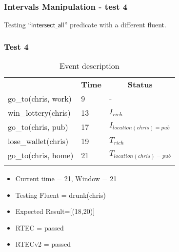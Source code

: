 \documentclass[8pt]{beamer}
\def \patsize {}
\def\intersectall{\textsf{\patsize intersect\_all}}
\begin{document}
\begin{frame}
    \frametitle{Intervals Manipulation - test 4}
    \small Testing ``$\intersectall$'' predicate with a different fluent.\linebreak
    \subsubsection{Test 4}
    \begin{minipage}{0.48\linewidth}
        \begin{table}[t!]
            \caption{Event description}
            \begin{center}

                \begin{tabular}{lll}
                    \hline\noalign{\smallskip}
                    \multicolumn{1}{l}{\textbf{Event}} & \multicolumn{1}{c}{\textbf{Time}} & \multicolumn{1}{c}{\textbf{Status}}   \\
                    go\_to(chris, work)& 9 & -\\
                    win\_lottery(chris)& 13 & $I_{rich}$\\
                    go\_to(chris, pub)& 17 & $I_{location(chris)=pub}$\\
                    lose\_wallet(chris)& 19 & $T_{rich}$ \\
                    go\_to(chris, home)& 21 & $T_{location(chris)=pub}$\\
                    \noalign{\smallskip}
                    \hline
                \end{tabular}
            \end{center}
        \end{table}

        \begin{itemize}
            \item Current time = 21, Window = 21
            \item Testing Fluent = drunk(chris)
            \item Expected Result=[(18,20)]
            \item RTEC = passed
            \item RTECv2 = passed
        \end{itemize} 
    \end{minipage}
    \begin{minipage}{0.48\linewidth}


\end{minipage}
\end{frame}
\end{document}
